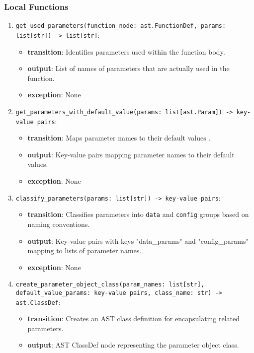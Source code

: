 \documentclass[12pt, titlepage]{article}
\begin{document}
\subsubsection{Local Functions}

\begin{enumerate}
  \item \texttt{get\_used\_parameters(function\_node: ast.FunctionDef, params: list[str]) -> list[str]}: 
  \begin{itemize}
    \item \textbf{transition}: Identifies parameters used within the function body.
    \item \textbf{output}: List of names of parameters that are actually used in the function.
    \item \textbf{exception}: None
  \end{itemize}
  \item \texttt{get\_parameters\_with\_default\_value(params: list[ast.Param]) -> key-value pairs}: 
  \begin{itemize}
    \item \textbf{transition}: Maps parameter names to their default values .
    \item \textbf{output}: Key-value pairs mapping parameter names to their default values.
    \item \textbf{exception}: None
  \end{itemize}
  \item \texttt{classify\_parameters(params: list[str]) -> key-value pairs}: 
  \begin{itemize}
    \item \textbf{transition}: Classifies parameters into \texttt{data} and \texttt{config} groups based on naming conventions.
    \item \textbf{output}: Key-value pairs with keys "data\_params" and "config\_params" mapping to lists of parameter names.
    \item \textbf{exception}: None
  \end{itemize}
  \item \texttt{create\_parameter\_object\_class(param\_names: list[str], default\_value\_params: key-value pairs, class\_name: str) -> ast.ClassDef}: 
  \begin{itemize}
    \item \textbf{transition}: Creates an AST class definition for encapsulating related parameters.
    \item \textbf{output}: AST ClassDef node representing the parameter object class.

\end{itemize}
\end{enumerate}
\end{document}

